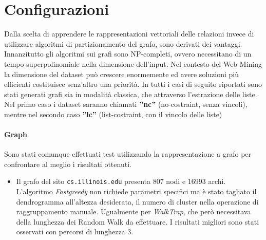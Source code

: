 \section{Configurazioni}
Dalla scelta di apprendere le rappresentazioni vettoriali delle relazioni invece di utilizzare algoritmi di partizionamento del grafo, sono derivati dei vantaggi. Innanzitutto gli algoritmi sui grafi sono NP-completi, ovvero necessitano di un tempo superpolinomiale nella dimensione dell'input. Nel contesto del Web Mining la dimensione del dataset può crescere enormemente ed avere soluzioni più efficienti costituisce senz'altro una priorità. In tutti i casi di seguito riportati sono stati generati grafi sia in modalità classica, che attraverso l'estrazione delle liste. Nel primo caso i dataset saranno chiamati \textbf{''nc''} (no-costraint, senza vincoli), mentre nel secondo caso \textbf{''lc''} (list-costraint, con il vincolo delle liste)

\paragraph{Graph}Sono stati comunque effettuati test utilizzando la rappresentazione a grafo per confrontare al meglio i risultati ottenuti. 
\begin{itemize}
\item Il grafo del sito \texttt{cs.illinois.edu} presenta $807$ nodi e $16993$ archi. L'algoritmo \textit{Fastgreedy} non richiede parametri specifici ma è stato tagliato il dendrogramma all'altezza desiderata, il numero di cluster nella operazione di raggruppamento manuale. Ugualmente per \textit{WalkTrap}, che però necessitava della lunghezza dei Random Walk da effettuare. I risultati migliori sono stati osservati con percorsi di lunghezza $3$.
\end{itemize}

